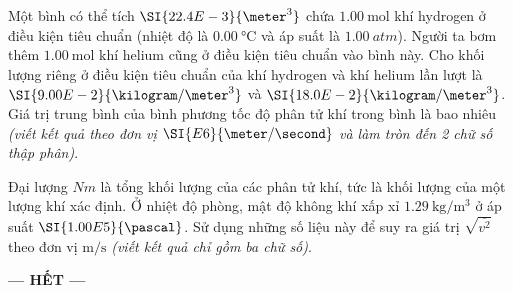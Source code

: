 \begin{ex}
Một bình có thể tích $\SI{22.4E-3}{\meter^3}$ chứa $\SI{1.00}{\mole}$ khí hydrogen ở điều kiện tiêu chuẩn (nhiệt độ là $\SI{0.00}{\celsius}$ và áp suất là $\SI{1.00}{atm}$). Người ta bơm thêm $\SI{1.00}{\mole}$ khí helium cũng ở điều kiện tiêu chuẩn vào bình này. Cho khối lượng riêng ở điều kiện tiêu chuẩn của khí hydrogen và khí helium lần lượt là $\SI{9.00E-2}{\kilogram/\meter^3}$ và $\SI{18.0E-2}{\kilogram/\meter^3}$. Giá trị trung bình của bình phương tốc độ phân tử khí trong bình là bao nhiêu \textit{(viết kết quả theo đơn vị $\SI{E6}{\meter/\second}$ và làm tròn đến 2 chữ số thập phân)}.
\end{ex}
\begin{ex}
	Đại lượng $Nm$ là tổng khối lượng của các phân tử khí, tức là khối lượng của một lượng khí xác định. Ở nhiệt độ phòng, mật độ không khí xấp xỉ $\SI{1.29}{\kilogram/\meter^3}$ ở áp suất $\SI{1.00E5}{\pascal}$. Sử dụng những số liệu này để suy ra giá trị $\sqrt{\overline{v^2}}$ theo đơn vị $\si{\meter/\second}$ \textit{(viết kết quả chỉ gồm ba chữ số)}.
\end{ex}
\begin{center}
	\textbf{--- HẾT ---}
\end{center}